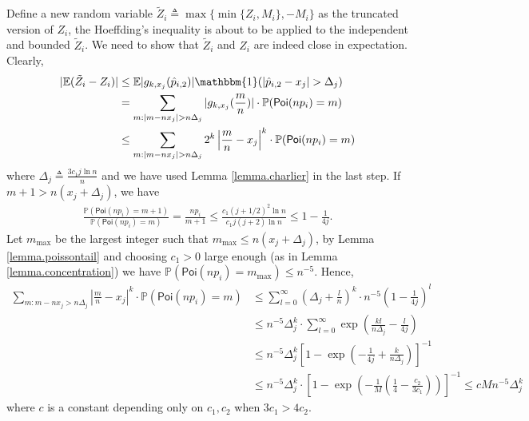 \documentclass[final,12pt]{colt2018} %
\def \bP {\mathbb{P}}
\def \bE {\mathbb{E}}
\def \spo {\mathsf{Poi}}
\begin{document}
Define a new random variable $\tilde{Z}_i\triangleq \max\{\min\{Z_i,M_i\},-M_i\}$ as the truncated version of $Z_i$, the Hoeffding's inequality is about to be applied to the independent and bounded $\tilde{Z}_i$. We need to show that $\tilde{Z}_i$ and $Z_i$ are indeed close in expectation. Clearly,
\begin{align*}
|\bE (\tilde{Z}_i-Z_i)| &\le \bE|g_{k,x_j}(\hat{p}_{i,2})|\mathbbm{1}(|\hat{p}_{i,2}-x_j|>\Delta_j) \\
&= \sum_{m: |m-nx_j|>n\Delta_j} |g_{k,x_j}(\frac{m}{n})|\cdot\bP(\spo(np_i)=m) \\
&\le \sum_{m: |m-nx_j|>n\Delta_j} 2^k\left|\frac{m}{n}-x_j\right|^k\cdot\bP(\spo(np_i)=m)
\end{align*}
where $\Delta_j\triangleq\frac{3c_1j\ln n}{n}$ and we have used Lemma \ref{lemma.charlier} in the last step. If $m+1>n(x_j+\Delta_j)$, we have
\begin{align*}
\frac{\bP(\spo(np_i)=m+1)}{\bP(\spo(np_i)=m)} = \frac{np_i}{m+1} \le \frac{c_1(j+1/2)^2\ln n}{c_1j(j+2)\ln n} \le 1 - \frac{1}{4j}.
\end{align*}
Let $m_{\max}$ be the largest integer such that $m_{\max}\le n(x_j+\Delta_j)$, by Lemma \ref{lemma.poissontail} and choosing $c_1>0$ large enough (as in Lemma \ref{lemma.concentration}) we have $\bP(\spo(np_i)=m_{\max})\le n^{-5}$. Hence,
\begin{align*}
\sum_{m: m-nx_j>n\Delta_j} \left|\frac{m}{n}-x_j\right|^k\cdot\bP(\spo(np_i)=m) &\le \sum_{l=0}^\infty (\Delta_j+\frac{l}{n})^k\cdot n^{-5}\left(1-\frac{1}{4j}\right)^l \\
&\le n^{-5}\Delta_j^k\cdot \sum_{l=0}^\infty \exp\left(\frac{kl}{n\Delta_j} - \frac{l}{4j}\right) \\
&\le n^{-5}\Delta_j^k\left[1-\exp\left(-\frac{1}{4j}+\frac{k}{n\Delta_j}\right)\right]^{-1}\\
&\le n^{-5}\Delta_j^k\cdot \left[1-\exp\left(-\frac{1}{M}\left(\frac{1}{4}-\frac{c_2}{3c_1}\right)\right)\right]^{-1} \le cMn^{-5}\Delta_j^k
\end{align*}
where $c$ is a constant depending only on $c_1,c_2$ when $3c_1>4c_2$. 
\end{document}
